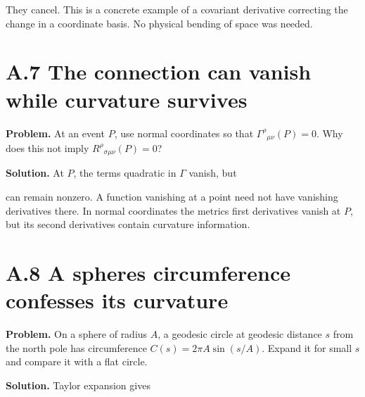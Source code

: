 \documentclass[
  11pt,
  letterpaper,
  oneside,
  openany]{scrbook}
\begin{document}
They cancel. This is a concrete example of a covariant derivative
correcting the change in a coordinate basis. No physical bending of
space was needed.

\hypertarget{a.7-the-connection-can-vanish-while-curvature-survives}{%
\section{A.7 The connection can vanish while curvature
survives}\label{a.7-the-connection-can-vanish-while-curvature-survives}}

\textbf{Problem.} At an event \(P\), use normal coordinates so that
\(\Gamma^\rho{}_{\mu\nu}(P)=0\). Why does this not imply
\(R^\rho{}_{\sigma\mu\nu}(P)=0\)?

\textbf{Solution.} At \(P\), the terms quadratic in \(\Gamma\) vanish,
but

\begin{center}
\begingroup
{}
\ifdim\wd\grmathbox>\linewidth
\resizebox{\linewidth}{!}{\usebox{\grmathbox}}
\else\usebox{\grmathbox}\fi
\endgroup
\end{center}

can remain nonzero. A function vanishing at a point need not have
vanishing derivatives there. In normal coordinates the
metric\textquotesingle s first derivatives vanish at \(P\), but its
second derivatives contain curvature information.

\hypertarget{a.8-a-spheres-circumference-confesses-its-curvature}{%
\section{A.8 A sphere\textquotesingle s circumference confesses its
curvature}\label{a.8-a-spheres-circumference-confesses-its-curvature}}

\textbf{Problem.} On a sphere of radius \(A\), a geodesic circle at
geodesic distance \(s\) from the north pole has circumference
\(C(s)=2\pi A\sin(s/A)\). Expand it for small \(s\) and compare it with
a flat circle.

\textbf{Solution.} Taylor expansion gives

\begin{center}
\begingroup
{}
\ifdim\wd\grmathbox>\linewidth
\resizebox{\linewidth}{!}{\usebox{\grmathbox}}
\else\usebox{\grmathbox}\fi
\endgroup
\end{center}
\end{document}
